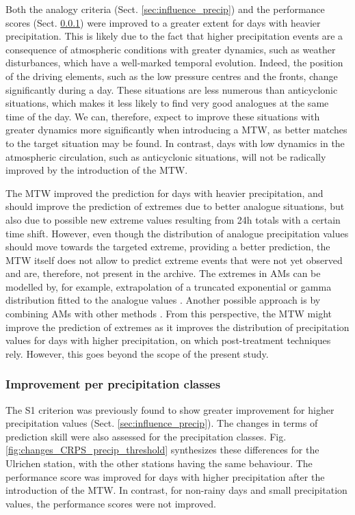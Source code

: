 \documentclass[hess, manuscript]{copernicus}
\begin{document}
	Both the analogy criteria (Sect. \ref{sec:influence_precip}) and the performance scores (Sect. \ref{sec:improvement_CRPS_precip_threshold}) were improved to a greater extent for days with heavier precipitation. This is likely due to the fact that higher precipitation events are a consequence of atmospheric conditions with greater dynamics, such as weather disturbances, which have a well-marked temporal evolution. Indeed, the position of the driving elements, such as the low pressure centres and the fronts, change significantly during a day. These situations are less numerous than anticyclonic situations, which makes it less likely to find very good analogues at the same time of the day. We can, therefore, expect to improve these situations with greater dynamics more significantly when introducing a MTW, as better matches to the target situation may be found. In contrast, days with low dynamics in the atmospheric circulation, such as anticyclonic situations, will not be radically improved by the introduction of the MTW.
	
	The MTW improved the prediction for days with heavier precipitation, and should improve the prediction of extremes due to better analogue situations, but also due to possible new extreme values resulting from 24h totals with a certain time shift. However, even though the distribution of analogue precipitation values should move towards the targeted extreme, providing a better prediction, the MTW itself does not allow to predict extreme events that were not yet observed and are, therefore, not present in the archive. The extremes in AMs can be modelled by, for example, extrapolation of a truncated exponential or gamma distribution fitted to the analogue values \citep{Obled2002}. Another possible approach is by combining AMs with other methods \citep[e.g.][]{Chardon2014}. From this perspective, the MTW might improve the prediction of extremes as it improves the distribution of precipitation values for days with higher precipitation, on which post-treatment techniques rely. However, this goes beyond the scope of the present study.
	
	\subsubsection{Improvement per precipitation classes}
	\label{sec:improvement_CRPS_precip_threshold}
	
	The S1 criterion was previously found to show greater improvement for higher precipitation values (Sect. \ref{sec:influence_precip}). The changes in terms of prediction skill were also assessed for the precipitation classes. Fig. \ref{fig:changes_CRPS_precip_threshold} synthesizes these differences for the Ulrichen station, with the other stations having the same behaviour. The performance score was improved for days with higher precipitation after the introduction of the MTW. In contrast, for non-rainy days and small precipitation values, the performance scores were not improved.
	
\end{document}
